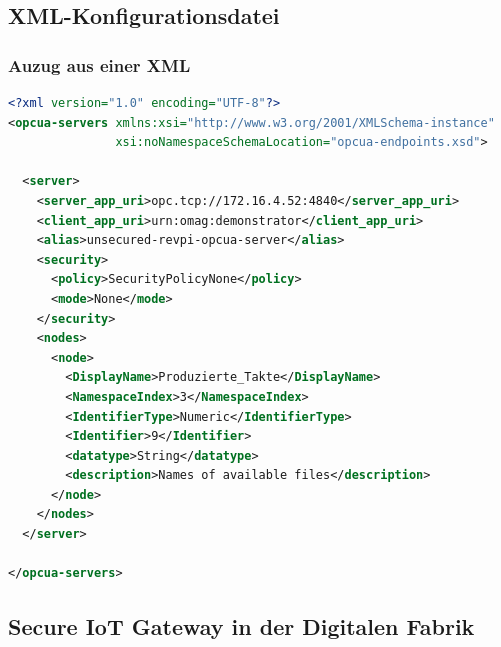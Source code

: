 \clearpage

\subsection{XML-Konfigurationsdatei}\label{sec:A1}
\subsubsection{Auzug aus einer XML}
\begin{lstlisting}[language=XML, frame=single, caption={Lorem ipsum.}, label={lst:xml-label}, captionpos=b]
<?xml version="1.0" encoding="UTF-8"?>
<opcua-servers xmlns:xsi="http://www.w3.org/2001/XMLSchema-instance"
               xsi:noNamespaceSchemaLocation="opcua-endpoints.xsd">

  <server>
    <server_app_uri>opc.tcp://172.16.4.52:4840</server_app_uri>
    <client_app_uri>urn:omag:demonstrator</client_app_uri>
    <alias>unsecured-revpi-opcua-server</alias>
    <security>
      <policy>SecurityPolicyNone</policy>
      <mode>None</mode>
    </security>
    <nodes>
      <node>
        <DisplayName>Produzierte_Takte</DisplayName>
        <NamespaceIndex>3</NamespaceIndex>
        <IdentifierType>Numeric</IdentifierType>
        <Identifier>9</Identifier>
        <datatype>String</datatype>
        <description>Names of available files</description>
      </node>
    </nodes>
  </server>
  
</opcua-servers>
\end{lstlisting}
\newpage

\subsection{Secure IoT Gateway in der Digitalen Fabrik}\label{sec:A_Demonstrator}
\begin{figure}[H]
    \centering
\end{figure}

